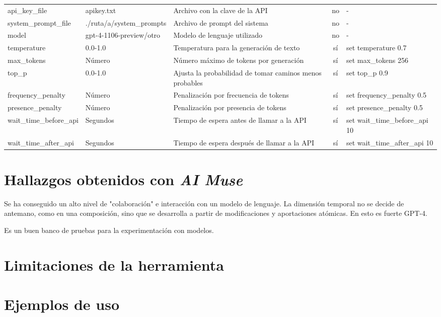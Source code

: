 \begin{landscape}
\begin{table}[htbp]
\begin{tabularx}{\linewidth}{lXlcl}
        api\_key\_file & \textcolor{pathcolor}{apikey.txt} & Archivo con la clave de la API & no & - \\
        system\_prompt\_file & \textcolor{pathcolor}{./ruta/a/system\_prompts} & Archivo de prompt del sistema & no & - \\
        model & gpt-4-1106-preview/otro & Modelo de lenguaje utilizado & no & - \\
        temperature & \textcolor{numbercolor}{0.0-1.0} & Temperatura para la generación de texto & sí & set temperature \textcolor{numbercolor}{0.7} \\
        max\_tokens & \textcolor{numbercolor}{Número} & Número máximo de tokens por generación & sí & set max\_tokens \textcolor{numbercolor}{256} \\
        top\_p & \textcolor{numbercolor}{0.0-1.0} & Ajusta la probabilidad de tomar caminos menos probables & sí & set top\_p \textcolor{numbercolor}{0.9} \\
        frequency\_penalty & \textcolor{numbercolor}{Número} & Penalización por frecuencia de tokens & sí & set frequency\_penalty \textcolor{numbercolor}{0.5} \\
        presence\_penalty & \textcolor{numbercolor}{Número} & Penalización por presencia de tokens & sí & set presence\_penalty \textcolor{numbercolor}{0.5} \\
        wait\_time\_before\_api & \textcolor{numbercolor}{Segundos} & Tiempo de espera antes de llamar a la API & sí & set wait\_time\_before\_api \textcolor{numbercolor}{10} \\
        wait\_time\_after\_api & \textcolor{numbercolor}{Segundos} & Tiempo de espera después de llamar a la API & sí & set wait\_time\_after\_api \textcolor{numbercolor}{10} \\
        \bottomrule
    \end{tabularx}
    \endgroup
    \source{\propio}
    \end{table}
    \end{landscape}
    





\section{Hallazgos obtenidos con \emph{AI Muse}}

Se ha conseguido un alto nivel de "colaboración" e interacción con un modelo de lenguaje. La dimensión temporal no se decide de antemano, como en una composición, sino que se desarrolla a partir de modificaciones y aportaciones atómicas. En esto es fuerte GPT-4.

Es un buen banco de pruebas para la experimentación con modelos. 

\section{Limitaciones de la herramienta}

\section{Ejemplos de uso}